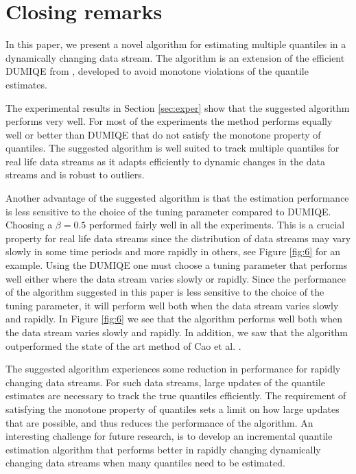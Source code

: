 \documentclass[10pt, a4paper]{article}
\newtheorem{rational for conjecture}{Rational for Conjecture}
\begin{document}
\section{Closing remarks}

In this paper, we present a novel algorithm for estimating multiple quantiles in a dynamically changing data stream.
The algorithm is an extension of the efficient DUMIQE from \cite{yazidi16}, developed to avoid monotone violations of the quantile estimates.

The experimental results in Section \ref{sec:exper} show that the suggested algorithm performs very well. For most of the experiments the method performs equally well or better than DUMIQE that do not satisfy the monotone property of quantiles. The suggested algorithm is well suited to track multiple quantiles for real life data streams as it adapts efficiently to dynamic changes in the data streams and is robust to outliers.

Another advantage of the suggested algorithm is that the estimation performance is less sensitive to the choice of the tuning parameter compared to DUMIQE. Choosing a $\beta = 0.5$ performed fairly well in all the experiments. This is a crucial property for real life data streams since the distribution of data streams may vary slowly in some time periods and more rapidly in others, see Figure \ref{fig:6} for an example. Using the DUMIQE one must choose a tuning parameter that performs well either where the data stream varies slowly or rapidly. Since the performance of the algorithm suggested in this paper is less sensitive to the choice of the tuning parameter, it will perform well both when the data stream varies slowly and rapidly. In Figure \ref{fig:6} we see that the algorithm performs well both when the data stream varies slowly and rapidly. In addition, we saw that the algorithm outperformed the state of the art method of Cao et al. \cite{cao2009incremental}.

The suggested algorithm experiences some reduction in performance for rapidly changing data streams. For such data streams, large updates of the quantile estimates are necessary to track the true quantiles efficiently. The requirement of satisfying the monotone property of quantiles sets a limit on how large updates that are possible, and thus reduces the performance of the algorithm. An interesting challenge for future research, is to develop an incremental quantile estimation algorithm that performs better in rapidly changing dynamically changing data streams when many quantiles need to be estimated.
\end{document}
